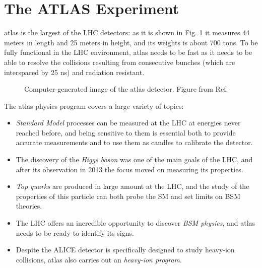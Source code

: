 
\section{The ATLAS Experiment}
\label{sed:cern:atlas}

\gls{atlas} \cite{atlas:atlas} is the largest of the LHC detectors: as it is shown in Fig. \ref{fig:atlas:atlas} it measures 44 meters in length and 25 meters in height, and its weights is about 700 tons. To be fully functional in the LHC environment,  \gls{atlas} needs to be fast as it needs to be able to resolve the collisions resulting from consecutive bunches (which are interspaced by 25 ns) and radiation resistant. 

\begin{figure}[ht]
\centering
{}
\caption{Computer-generated image of the \gls{atlas} detector. Figure from Ref. \cite{atlas:atlas}}
\label{fig:atlas:atlas}
\end{figure}

The \gls{atlas} physics program covers a large variety of topics: 
\begin{itemize}
\item \textit{Standard Model} processes can be measured at the LHC at energies never reached before, and being sensitive to them is essential both to provide accurate measurements and to use them as candles to calibrate the detector. 
\item The discovery of the \textit{Higgs boson} was one of the main goals of the LHC, and after its observation in 2013 the focus moved on measuring its properties. 
\item \textit{Top quarks} are produced in large amount at the LHC, and the study of the properties of this particle can both probe the SM and set limits on BSM theories.
\item The LHC offers an incredible opportunity to discover \textit{BSM physics}, and \gls{atlas} needs to be ready to identify its signs.
\item Despite the ALICE detector is specifically designed to study heavy-ion collisions, \gls{atlas} also carries out an \textit{heavy-ion program}.
\end{itemize}

